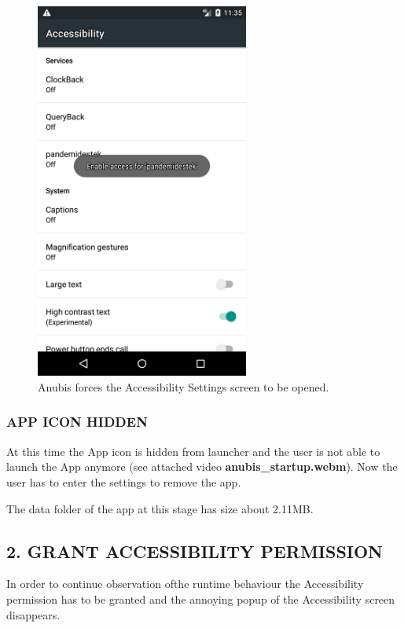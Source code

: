 \documentclass[10pt,titlepage]{article}
\begin{document}
\begin{figure}[H]
  \begin{center}
  \includegraphics[width=7cm]{anubis_accessibility.png}
  \end{center}
  \caption{Anubis forces the Accessibility Settings screen to be opened.}
  \label{fig:anubis_open_accessibiltiy}
\end{figure}


\subsubsection{APP ICON HIDDEN}
At this time the App icon is hidden from launcher and the user is not able to launch the App anymore (see attached video \textbf{anubis\_startup.webm}). Now the user has to enter the settings to remove the app.

The data folder of the app at this stage has size about 2.11MB.



\subsection{2. GRANT ACCESSIBILITY PERMISSION}
In order to continue observation ofthe runtime behaviour the Accessibility permission has to be granted and the annoying popup of the Accessibility screen disappears.
\end{document}
